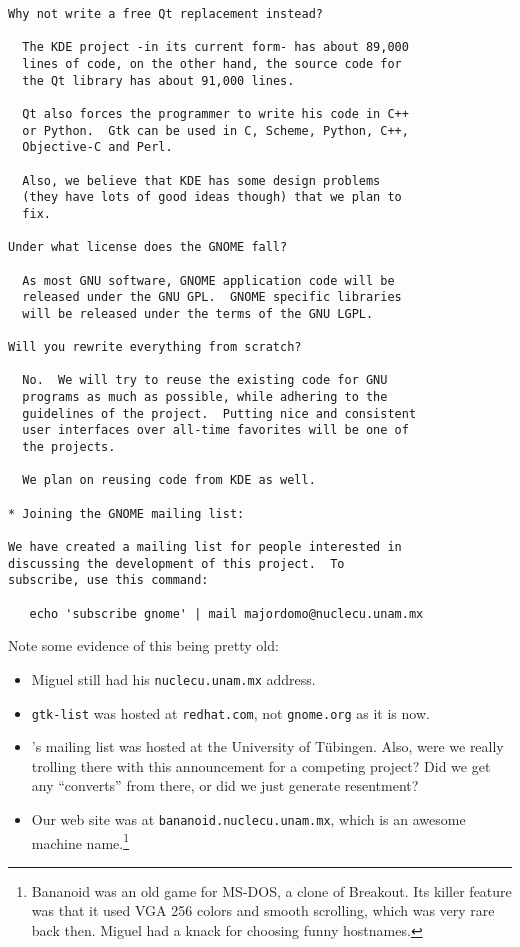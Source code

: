 \begin{lstlisting}[basicstyle=\footnotesize,
    frame=single,
    framerule=0pt,
    backgroundcolor=\color{lightgray},
    xleftmargin=0pt]
Why not write a free Qt replacement instead?

  The KDE project -in its current form- has about 89,000
  lines of code, on the other hand, the source code for
  the Qt library has about 91,000 lines.

  Qt also forces the programmer to write his code in C++
  or Python.  Gtk can be used in C, Scheme, Python, C++,
  Objective-C and Perl.

  Also, we believe that KDE has some design problems
  (they have lots of good ideas though) that we plan to
  fix.

Under what license does the GNOME fall?

  As most GNU software, GNOME application code will be
  released under the GNU GPL.  GNOME specific libraries
  will be released under the terms of the GNU LGPL.

Will you rewrite everything from scratch?

  No.  We will try to reuse the existing code for GNU
  programs as much as possible, while adhering to the
  guidelines of the project.  Putting nice and consistent
  user interfaces over all-time favorites will be one of
  the projects.

  We plan on reusing code from KDE as well.

* Joining the GNOME mailing list:

We have created a mailing list for people interested in
discussing the development of this project.  To
subscribe, use this command:

   echo 'subscribe gnome' | mail majordomo@nuclecu.unam.mx
\end{lstlisting}

Note some evidence of this being pretty old:

\begin{itemize}

\item{Miguel still had his {\tt nuclecu.unam.mx} address.}

\item{{\tt gtk-list} was hosted at {\tt redhat.com}, not
  {\tt gnome.org} as it is now.}

\item{\KDE's mailing list was hosted at the University of
  Tübingen.  Also, were we really trolling there with
  this announcement for a competing project?  Did we get
  any ``converts'' from there, or did we just generate
  resentment?}

\item{Our web site was at {\tt bananoid.nuclecu.unam.mx},
  which is an awesome machine name.\footnote{Bananoid was
    an old game for MS-DOS, a clone of Breakout.  Its
    killer feature was that it used VGA 256 colors and
    smooth scrolling, which was very rare back then.
    Miguel had a knack for choosing funny hostnames.}}

\end{itemize}

